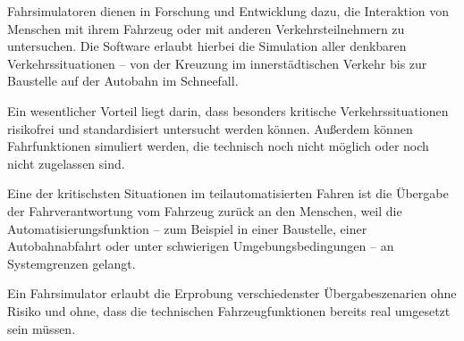 \renewcommand\categorylabel{[PROJEKT.EINBLICK]}

\renewcommand\authorsline{Vorname Nachname, Vorname Nachname, Vorname Nachname, ...}

{%
\vspace{5.5cm} %
\pagecolor{black} %
}




\afterpage{%
\resetSSColor
}


{\mediumfamily\color{white} Fahrsimulatoren dienen in Forschung und Entwicklung dazu, die Interaktion von Menschen mit ihrem Fahrzeug oder mit anderen Verkehrsteilnehmern zu untersuchen. Die Software erlaubt hierbei die Simulation aller denkbaren Verkehrssituationen -- von der Kreuzung im innerstädtischen Verkehr bis zur Baustelle auf der Autobahn im Schneefall. 

Ein wesentlicher Vorteil liegt darin, dass besonders kritische Verkehrssituationen risikofrei und standardisiert untersucht werden können. Außerdem können Fahrfunktionen simuliert werden, die technisch noch nicht möglich oder noch nicht zugelassen sind.


Eine der kritischsten Situationen im teilautomatisierten Fahren ist die Übergabe der Fahrverantwortung vom Fahrzeug zurück an den Menschen, weil die Automatisierungsfunktion -- zum Beispiel in einer Baustelle, einer Autobahnabfahrt oder unter schwierigen Umgebungsbedingungen -- an Systemgrenzen gelangt.

Ein Fahrsimulator erlaubt die Erprobung verschiedenster Übergabeszenarien ohne Risiko und ohne, dass die technischen Fahrzeugfunktionen bereits real umgesetzt sein müssen.}



